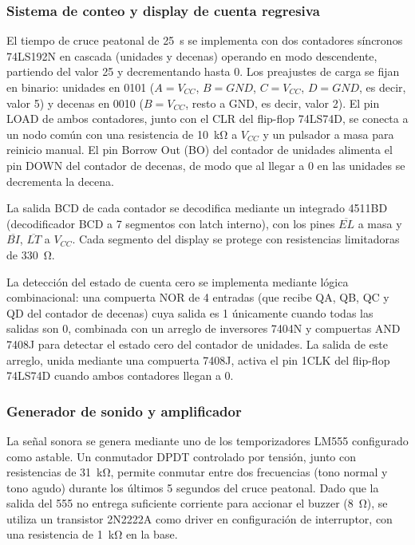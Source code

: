 \documentclass[10pt,onecolumn]{IEEEtran}
\begin{document}
\subsubsection{Sistema de conteo y display de cuenta regresiva}

El tiempo de cruce peatonal de \SI{25}{\second} se implementa con dos contadores síncronos 74LS192N en cascada (unidades y decenas) operando en modo descendente, partiendo del valor 25 y decrementando hasta 0. Los preajustes de carga se fijan en binario: unidades en 0101 ($A=V_{CC}$, $B=GND$, $C=V_{CC}$, $D=GND$, es decir, valor 5) y decenas en 0010 ($B=V_{CC}$, resto a GND, es decir, valor 2). El pin LOAD de ambos contadores, junto con el CLR del flip-flop 74LS74D, se conecta a un nodo común con una resistencia de \SI{10}{\kilo\ohm} a $V_{CC}$ y un pulsador a masa para reinicio manual. El pin Borrow Out (BO) del contador de unidades alimenta el pin DOWN del contador de decenas, de modo que al llegar a 0 en las unidades se decrementa la decena.

La salida BCD de cada contador se decodifica mediante un integrado 4511BD (decodificador BCD a 7 segmentos con latch interno), con los pines $\overline{EL}$ a masa y $\overline{BI}$, $\overline{LT}$ a $V_{CC}$. Cada segmento del display se protege con resistencias limitadoras de \SI{330}{\ohm}.

La detección del estado de cuenta cero se implementa mediante lógica combinacional: una compuerta NOR de 4 entradas (que recibe QA, QB, QC y QD del contador de decenas) cuya salida es 1 únicamente cuando todas las salidas son 0, combinada con un arreglo de inversores 7404N y compuertas AND 7408J para detectar el estado cero del contador de unidades. La salida de este arreglo, unida mediante una compuerta 7408J, activa el pin 1CLK del flip-flop 74LS74D cuando ambos contadores llegan a 0.

\subsubsection{Generador de sonido y amplificador}

La señal sonora se genera mediante uno de los temporizadores LM555 configurado como astable. Un conmutador DPDT controlado por tensión, junto con resistencias de \SI{31}{\kilo\ohm}, permite conmutar entre dos frecuencias (tono normal y tono agudo) durante los últimos 5 segundos del cruce peatonal. Dado que la salida del 555 no entrega suficiente corriente para accionar el buzzer (\SI{8}{\ohm}), se utiliza un transistor 2N2222A como driver en configuración de interruptor, con una resistencia de \SI{1}{\kilo\ohm} en la base.
\end{document}
